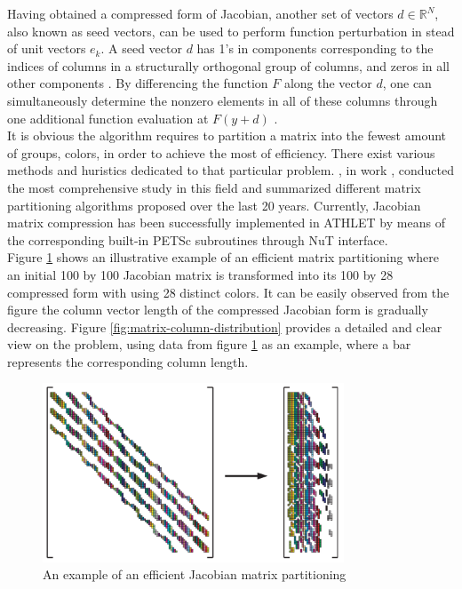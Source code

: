 

Having obtained a compressed form of Jacobian, another set of vectors $d \in \mathbb{R}^{N}$, also known as seed vectors, can be used to perform function perturbation in stead of unit vectors $e_{k}$. A seed vector $d$ has 1’s in components corresponding to the indices of columns in a structurally orthogonal group of columns, and zeros in all other components \cite{gebremedhin2005color}. By differencing the function $F$ along the vector $d$, one can simultaneously determine the nonzero elements in all of these columns through one additional function evaluation at $F(y+d)$ \cite{gebremedhin2005color}.\\


It is obvious the algorithm requires to partition a matrix into the fewest amount of groups, colors, in order to achieve the most of efficiency. There exist various methods and huristics dedicated to that particular problem. \citeauthor{gebremedhin2005color}, in work \cite{gebremedhin2005color}, conducted the most comprehensive study in this field and summarized different matrix partitioning algorithms proposed over the last 20 years. Currently, Jacobian matrix compression has been successfully implemented in ATHLET by means of the corresponding built-in PETSc subroutines through NuT interface.\\


Figure \ref{fig:matrix-partitioning-example} shows an illustrative example of an efficient matrix partitioning where an initial 100 by 100 Jacobian matrix is transformed into its 100 by 28 compressed form with using 28 distinct colors. It can be easily observed from the figure the column vector length of the compressed Jacobian form is gradually decreasing. Figure \ref{fig:matrix-column-distribution} provides a detailed and clear view on the problem, using data from figure \ref{fig:matrix-partitioning-example} as an example, where a bar represents  the corresponding column length.\\


\figpointer{\ref{fig:matrix-partitioning-example}}
\begin{figure}[htpb]
  \centering
  \includegraphics[width=0.8\textwidth]{figures/matrix-compression.png}
  \caption{An example of an efficient Jacobian matrix partitioning \cite{gebremedhin2005color}} \label{fig:matrix-partitioning-example}
\end{figure}


